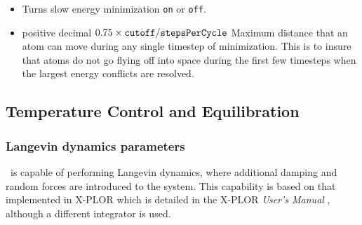 \begin{itemize}

\item
{}
{Turns slow energy minimization {\tt on} or {\tt off}.}

\item
{}
{positive decimal}
{$0.75\times\mbox{{\tt cutoff}}/\mbox{{\tt stepsPerCycle}}$}
{Maximum distance that an atom can move during any single timestep of
minimization.  This is to insure that atoms do not go flying off into
space during the first few timesteps when the largest energy conflicts
are resolved.}

\end{itemize}

\subsection{Temperature Control and Equilibration}

\subsubsection{Langevin dynamics parameters}

\NAMD\ is capable
of performing Langevin dynamics, where additional damping and
random forces are introduced to the system.  This capability
is based on that implemented in X-PLOR which is detailed
in the X-PLOR {\it User's Manual} ,
although a different integrator is used.

